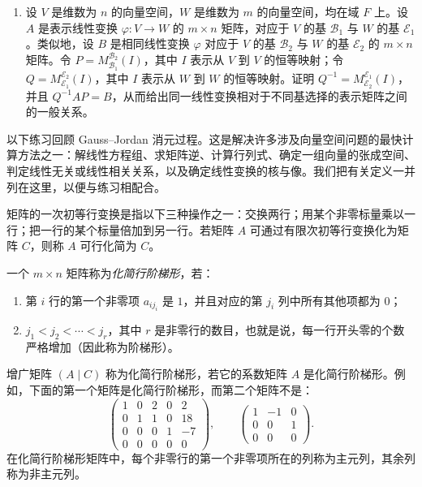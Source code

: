 \begin{enumerate}[label=\arabic*.]
\[\]
证明若 $W$ 是由 $v_1$ 生成的子空间，则 $W$ 在 $\varphi$ 的作用下稳定。证明不存在 $\varphi$-不变子空间 $W'$ 使得 $V=W\oplus W'$。
\item 设 $V$ 是维数为 $n$ 的向量空间，$W$ 是维数为 $m$ 的向量空间，均在域 $F$ 上。设 $A$ 是表示线性变换 $\varphi:V\to W$ 的 $m\times n$ 矩阵，对应于 $V$ 的基 $\mathcal B_1$ 与 $W$ 的基 $\mathcal E_1$。类似地，设 $B$ 是相同线性变换 $\varphi$ 对应于 $V$ 的基 $\mathcal B_2$ 与 $W$ 的基 $\mathcal E_2$ 的 $m\times n$ 矩阵。令 $P=M_{\mathcal B_1}^{\mathcal B_2}(I)$，其中 $I$ 表示从 $V$ 到 $V$ 的恒等映射；令 $Q=M_{\mathcal E_1}^{\mathcal E_2}(I)$，其中 $I$ 表示从 $W$ 到 $W$ 的恒等映射。证明 $Q^{-1}=M_{\mathcal E_2}^{\mathcal E_1}(I)$，并且 $Q^{-1}AP=B$，从而给出同一线性变换相对于不同基选择的表示矩阵之间的一般关系。
\end{enumerate}

以下练习回顾 Gauss--Jordan 消元过程。这是解决许多涉及向量空间问题的最快计算方法之一：解线性方程组、求矩阵逆、计算行列式、确定一组向量的张成空间、判定线性无关或线性相关关系，以及确定线性变换的核与像。我们把有关定义一并列在这里，以便与练习相配合。

矩阵的一次初等行变换是指以下三种操作之一：交换两行；用某个非零标量乘以一行；把一行的某个标量倍加到另一行。若矩阵 $A$ 可通过有限次初等行变换化为矩阵 $C$，则称 $A$ 可行化简为 $C$。

一个 $m\times n$ 矩阵称为\emph{化简行阶梯形}，若：
\begin{enumerate}[label=(\alph*)]
\item 第 $i$ 行的第一个非零项 $a_{i j_i}$ 是 $1$，并且对应的第 $j_i$ 列中所有其他项都为 $0$；
\item $j_1<j_2<\cdots<j_r$，其中 $r$ 是非零行的数目，也就是说，每一行开头零的个数严格增加（因此称为阶梯形）。
\end{enumerate}
增广矩阵 $(A\mid C)$ 称为化简行阶梯形，若它的系数矩阵 $A$ 是化简行阶梯形。例如，下面的第一个矩阵是化简行阶梯形，而第二个矩阵不是：
\[
\begin{pmatrix}
1&0&2&0&2\\
0&1&1&0&18\\
0&0&0&1&-7\\
0&0&0&0&0
\end{pmatrix},
\qquad
\begin{pmatrix}
1&-1&0\\
0&0&1\\
0&0&0
\end{pmatrix}.
\]
在化简行阶梯形矩阵中，每个非零行的第一个非零项所在的列称为主元列，其余列称为非主元列。

